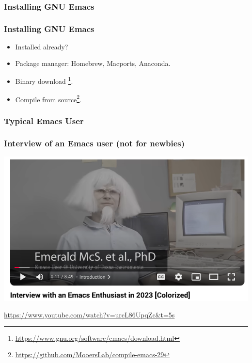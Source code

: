 \documentclass[aspectratio=169]{beamer}
\begin{document}
\subsubsection{Installing GNU Emacs}
\begin{frame}
\frametitle{Installing GNU Emacs}
\Large{
\begin{center}
\begin{itemize}[font=$\bullet$\scshape\bfseries]
    \item Installed already?
    \item Package manager: Homebrew, Macports, Anaconda.
    \item Binary download \footnote{\url{https://www.gnu.org/software/emacs/download.html}}.
    \item Compile from source\footnote{\url{https://github.com/MooersLab/compile-emacs-29}}.
\end{itemize}
\end{center}
}
\end{frame}


\subsubsection{Typical Emacs User}
\begin{frame}
\frametitle{Interview of an Emacs user (not for newbies)}
\begin{center}
    \includegraphics[scale=0.5]{Figures/EmacsUser.png}
\end{center}
\url{https://www.youtube.com/watch?v=urcL86UpqZc&t=5s}
\end{frame}
\end{document}
